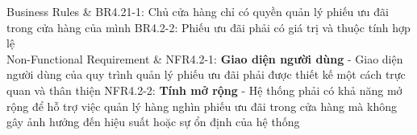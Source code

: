 \begin{usecase_table}
                    \hline
                    Business Rules	& BR4.21-1: Chủ cửa hàng chỉ có quyền quản lý phiếu ưu đãi trong cửa hàng của mình\newline
                    BR4.2-2: Phiếu ưu đãi phải có giá trị và thuộc tính hợp lệ\\
                    \hline
                    Non-Functional Requirement & NFR4.2-1: \textbf{Giao diện người dùng} - Giao diện người dùng của quy trình quản lý phiếu ưu đãi phải được thiết kế một cách trực quan và thân thiện
                    \newline
                    NFR4.2-2: \textbf{Tính mở rộng} - Hệ thống phải có khả năng mở rộng để hỗ trợ việc quản lý hàng nghìn phiếu ưu đãi trong cửa hàng mà không gây ảnh hưởng đến hiệu suất hoặc sự ổn định của hệ thống
                    \\
                    \hline
                \end{usecase_table}  
